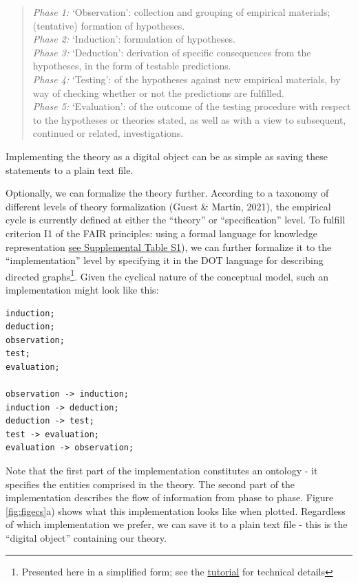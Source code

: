 \documentclass[man]{apa7}
\begin{document}
\begin{quote}
\emph{Phase 1:} `Observation': collection and grouping of empirical materials; (tentative) formation of hypotheses.\\
\emph{Phase 2:} `Induction': formulation of hypotheses.\\
\emph{Phase 3:} `Deduction': derivation of specific consequences from the hypotheses, in the form of testable predictions.\\
\emph{Phase 4:} `Testing': of the hypotheses against new empirical materials, by way of checking whether or not the predictions are fulfilled.\\
\emph{Phase 5:} `Evaluation': of the outcome of the testing procedure with respect to the hypotheses or theories stated, as well as with a view to subsequent, continued or related, investigations.
\end{quote}

Implementing the theory as a digital object can be as simple as saving these statements to a plain text file.

Optionally, we can formalize the theory further.
According to a taxonomy of different levels of theory formalization (Guest \& Martin, 2021),
the empirical cycle is currently defined at either the ``theory'' or ``specification'' level.
To fulfill criterion I1 of the FAIR principles: using a formal language for knowledge representation \href{https://github.com/cjvanlissa/fair_theory/blob/main/fair_principles.csv}{see Supplemental Table S1}), we can further formalize it to the ``implementation'' level by specifying it in the DOT language for describing directed graphs\footnote{Presented here in a simplified form; see the \href{https://cjvanlissa.github.io/theorytools/articles/fair-theory.html}{tutorial} for technical details}.
Given the cyclical nature of the conceptual model, such an implementation might look like this:

\begin{verbatim}
induction;
deduction;
observation;
test;
evaluation;

observation -> induction;
induction -> deduction;
deduction -> test;
test -> evaluation;
evaluation -> observation;
\end{verbatim}

Note that the first part of the implementation constitutes an ontology - it specifies the entities comprised in the theory.
The second part of the implementation describes the flow of information from phase to phase.
Figure \ref{fig:figecs}a) shows what this implementation looks like when plotted.
Regardless of which implementation we prefer,
we can save it to a plain text file - this is the ``digital object'' containing our theory.
\end{document}
